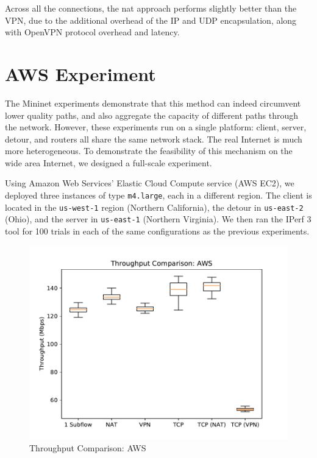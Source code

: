 \documentclass{cwru}
\begin{document}
Across all the connections, the \ac{nat} approach performs slightly better than
the VPN, due to the additional overhead of the IP and UDP encapsulation, along
with OpenVPN protocol overhead and latency.

\section{AWS Experiment}

The Mininet experiments demonstrate that this method can indeed circumvent lower
quality paths, and also aggregate the capacity of different paths through the
network. However, these experiments run on a single platform: client, server,
detour, and routers all share the same network stack. The real Internet is much
more heterogeneous. To demonstrate the feasibility of this mechanism on the wide
area Internet, we designed a full-scale experiment.

Using Amazon Web Services' Elastic Cloud Compute service (AWS EC2), we deployed
three instances of type \texttt{m4.large}, each in a different region. The
client is located in the \texttt{us-west-1} region (Northern California), the
detour in \texttt{us-east-2} (Ohio), and the server in \texttt{us-east-1}
(Northern Virginia). We then ran the IPerf 3 tool for 100 trials in each of the
same configurations as the previous experiments.

\begin{figure}
  \centering
  \includegraphics[height=0.45\textheight]{figures/aws.pdf}
  \caption{Throughput Comparison: AWS}
  \label{fig:aws}
\end{figure}
\end{document}
